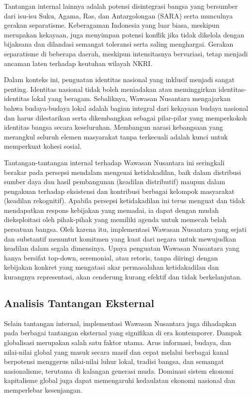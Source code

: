 \documentclass[12pt, a4paper]{article}
\begin{document}
Tantangan internal lainnya adalah potensi disintegrasi bangsa yang bersumber dari isu-isu Suku, Agama, Ras, dan Antargolongan (SARA) serta munculnya gerakan separatisme. Keberagaman Indonesia yang luar biasa, meskipun merupakan kekayaan, juga menyimpan potensi konflik jika tidak dikelola dengan bijaksana dan dilandasi semangat toleransi serta saling menghargai. Gerakan separatisme di beberapa daerah, meskipun intensitasnya bervariasi, tetap menjadi ancaman laten terhadap keutuhan wilayah NKRI.  

Dalam konteks ini, penguatan identitas nasional yang inklusif menjadi sangat penting. Identitas nasional tidak boleh meniadakan atau meminggirkan identitas-identitas lokal yang beragam. Sebaliknya, Wawasan Nusantara mengajarkan bahwa budaya-budaya lokal adalah bagian integral dari kekayaan budaya nasional dan harus dilestarikan serta dikembangkan sebagai pilar-pilar yang memperkokoh identitas bangsa secara keseluruhan. Membangun narasi kebangsaan yang merangkul seluruh elemen masyarakat tanpa terkecuali adalah kunci untuk memperkuat kohesi sosial.  

Tantangan-tantangan internal terhadap Wawasan Nusantara ini seringkali berakar pada persepsi mendalam mengenai ketidakadilan, baik dalam distribusi sumber daya dan hasil pembangunan (keadilan distributif) maupun dalam pengakuan terhadap eksistensi dan kontribusi berbagai kelompok masyarakat (keadilan rekognitif). Apabila persepsi ketidakadilan ini terus menguat dan tidak mendapatkan respons kebijakan yang memadai, ia dapat dengan mudah dieksploitasi oleh pihak-pihak yang memiliki agenda untuk memecah belah persatuan bangsa. Oleh karena itu, implementasi Wawasan Nusantara yang sejati dan substantif menuntut komitmen yang kuat dari negara untuk mewujudkan keadilan dalam segala dimensinya. Upaya penguatan Wawasan Nusantara yang hanya bersifat top-down, seremonial, atau retoris, tanpa diiringi dengan kebijakan konkret yang mengatasi akar permasalahan ketidakadilan dan kurangnya representasi, akan cenderung kurang efektif dan tidak berkelanjutan.
\subsection*{Analisis Tantangan Eksternal}

Selain tantangan internal, implementasi Wawasan Nusantara juga dihadapkan pada berbagai tantangan eksternal yang signifikan di era kontemporer. Dampak globalisasi merupakan salah satu faktor utama. Arus informasi, budaya, dan nilai-nilai global yang masuk secara masif dan cepat melalui berbagai kanal berpotensi menggerus nilai-nilai luhur lokal, tradisi bangsa, dan semangat nasionalisme, terutama di kalangan generasi muda. Dominasi sistem ekonomi kapitalisme global juga dapat memengaruhi kedaulatan ekonomi nasional dan memperlebar kesenjangan.  
\end{document}
